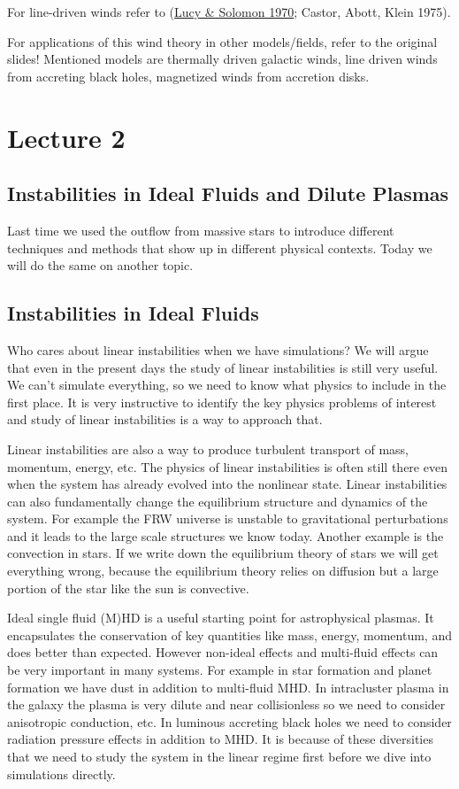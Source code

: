 \documentclass[letterpaper, 11pt]{article}
\numberwithin{equation}{section}
\numberwithin{figure}{section}
\begin{document}
For line-driven winds refer to (\href{http://adsabs.harvard.edu/abs/1970ApJ...159..879L}{Lucy \& Solomon 1970}; Castor, Abott, Klein 1975).

For applications of this wind theory in other models/fields, refer to the
original slides! Mentioned models are thermally driven galactic winds, line
driven winds from accreting black holes, magnetized winds from accretion disks.

\section{Lecture 2}

\subsection{Instabilities in Ideal Fluids and Dilute Plasmas}

Last time we used the outflow from massive stars to introduce different
techniques and methods that show up in different physical contexts. Today we
will do the same on another topic.

\subsection{Instabilities in Ideal Fluids}

Who cares about linear instabilities when we have simulations? We will argue
that even in the present days the study of linear instabilities is still very
useful. We can't simulate everything, so we need to know what physics to include
in the first place. It is very instructive to identify the key physics problems
of interest and study of linear instabilities is a way to approach that.

Linear instabilities are also a way to produce turbulent transport of mass,
momentum, energy, etc. The physics of linear instabilities is often still there
even when the system has already evolved into the nonlinear state. Linear
instabilities can also fundamentally change the equilibrium structure and
dynamics of the system. For example the FRW universe is unstable to
gravitational perturbations and it leads to the large scale structures we know
today. Another example is the convection in stars. If we write down the
equilibrium theory of stars we will get everything wrong, because the
equilibrium theory relies on diffusion but a large portion of the star like the
sun is convective.

Ideal single fluid (M)HD is a useful starting point for astrophysical plasmas.
It encapsulates the conservation of key quantities like mass, energy, momentum,
and does better than expected. However non-ideal effects and multi-fluid effects
can be very important in many systems. For example in star formation and planet
formation we have dust in addition to multi-fluid MHD. In intracluster plasma in
the galaxy the plasma is very dilute and near collisionless so we need to
consider anisotropic conduction, etc. In luminous accreting black holes we need
to consider radiation pressure effects in addition to MHD. It is because of
these diversities that we need to study the system in the linear regime first
before we dive into simulations directly.
\end{document}
